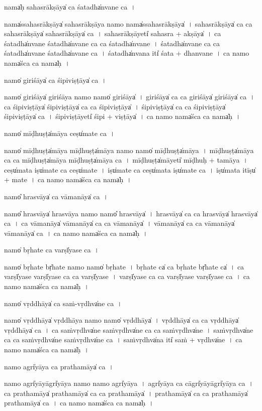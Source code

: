 \documentclass[parskip, DIV=14]{scrartcl}
\begin{document}
{nama̍ḥ sahasrā॒kṣāya̍ ca śa॒tadha̍nvane ca॒~।

nama̍ssahasrā॒kṣāya̍ sahasrā॒kṣāya॒ namo॒ nama̍ssahasrā॒kṣāya̍~।
sa॒ha॒srā॒kṣāya̍ ca ca  sahasrā॒kṣāya̍ sahasrā॒kṣāya̍ ca~।
sa॒ha॒srā॒kṣāyeti̍ sahasra + a॒kṣāya̍~।
ca॒ śa॒tadha̍nvane śa॒tadha̍nvane ca ca śa॒tadha̍nvane~।
śa॒tadha̍nvane ca ca śa॒tadha̍nvane śa॒tadha̍nvane ca~।
śa॒tadha̍nvana॒ iti̍ śa॒ta + dha॒nva॒ne॒~।
ca॒ namo॒ nama̍śca ca॒ nama̍ḥ~।

namo̍ giri॒śāya̍ ca śipivi॒ṣṭāya̍ ca॒~।

namo̍ giri॒śāya̍ giri॒śāya॒ namo॒ namo̍ giri॒śāya̍~।
gi॒ri॒śāya̍ ca ca giri॒śāya̍ giri॒śāya̍ ca~।
ca॒ śi॒pi॒vi॒ṣṭāya̍ śipivi॒ṣṭāya̍ ca ca śipivi॒ṣṭāya̍~।
śi॒pi॒vi॒ṣṭāya̍ ca ca śipivi॒ṣṭāya̍ śipivi॒ṣṭāya̍ ca~।
śi॒pi॒vi॒ṣṭāyeti̍ śipi + vi॒ṣṭāya̍~।
ca॒ namo॒ nama̍śca ca॒ nama̍ḥ~।

namo̍ mī॒ḍhuṣṭa̍māya॒ ceṣu̍mate ca॒~।

namo̍ mī॒ḍhuṣṭa̍māya mī॒ḍhuṣṭa̍māya॒ namo॒ namo̍ mī॒ḍhuṣṭa̍māya~।
mī॒ḍhuṣṭa̍māya ca ca  mī॒ḍhuṣṭa̍māya mī॒ḍhuṣṭa̍māya ca~।
mī॒ḍhuṣṭa̍mā॒yeti̍ mī॒ḍhuḥ + ta॒mā॒ya॒~।
ceṣu̍mata॒ iṣu̍mate ca॒ ceṣu̍mate~।
iṣu̍mate  ca॒ ceṣu̍mata॒ iṣu̍mate ca~।
iṣu̍mata॒ itīṣu̍ + ma॒te॒~। 
ca॒ namo॒ nama̍śca ca॒ nama̍ḥ~।

namo̎ hra॒svāya̍ ca vāma॒nāya̍ ca॒~।

namo̎ hra॒svāya̍ hra॒svāya॒ namo॒ namo̎ hra॒svāya̍~।
hra॒svāya̍ ca ca hra॒svāya̍ hra॒svāya̍ ca~।
ca॒ vā॒ma॒nāya̍ vāma॒nāya̍ ca ca vāma॒nāya̍~।
vā॒ma॒nāya̍ ca ca vāma॒nāya̍ vāma॒nāya̍ ca~।
ca॒ namo॒ nama̍śca ca॒ nama̍ḥ~।

namo̍ bṛha॒te ca॒ varṣī̍yase ca॒~।

namo̍ bṛha॒te bṛ̍ha॒te namo॒ namo̍ bṛha॒te~।
bṛ॒ha॒te ca̍ ca bṛha॒te bṛ̍ha॒te ca̍~।
ca॒ varṣī̍yase॒ varṣī̍yase ca ca॒ varṣī̍yase~।
varṣī̍yase ca ca॒  varṣī̍yase॒ varṣī̍yase ca~।
ca॒ namo॒ nama̍śca ca॒ nama̍ḥ~।

namo̍ vṛ॒ddhāya̍ ca sa॒ṁ-vṛdhva̍ne ca~।

namo̍ vṛ॒ddhāya̍ vṛ॒ddhāya॒ namo॒ namo̍ vṛ॒ddhāya̍~।
vṛ॒ddhāya̍ ca ca vṛ॒ddhāya̍ vṛ॒ddhāya̍ ca~।
ca॒ sa॒ṁvṛdhva̍ne sa॒ṁvṛdhva̍ne ca ca sa॒ṁvṛdhva̍ne~।
sa॒ṁvṛdhva̍ne ca ca sa॒ṁvṛdhva̍ne sa॒ṁvṛdhva̍ne ca~।
sa॒ṁvṛdhva̍na॒ iti̍ saṁ + vṛdhva̍ne~।
ca॒ namo॒ nama̍śca ca॒ nama̍ḥ~।

namo॒ agri̍yāya ca pratha॒māya̍ ca॒~।

namo॒ agri̍yā॒yāgri̍yāya॒ namo॒ namo॒ agri̍yāya~।
agri̍yāya ca॒ cāgri̍yā॒yāgri̍yāya ca~।
ca॒ pra॒tha॒māya̍ pratha॒māya̍ ca ca pratha॒māya̍~।
pra॒tha॒māya̍ ca ca pratha॒māya̍ pratha॒māya̍ ca~।
ca॒ namo॒ nama̍śca ca॒ nama̍ḥ~।


}
\end{document}
